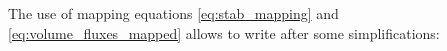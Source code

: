 The use of mapping equations \eqref{eq:stab_mapping} and \eqref{eq:volume_fluxes_mapped} allows to write after some simplifications:
